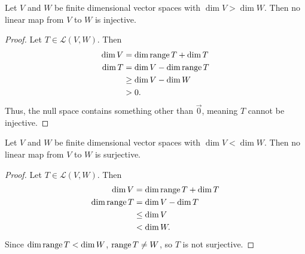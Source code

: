\begin{corollary}
	Let $V$ and $W$ be finite dimensional vector spaces with $\dim{V} > \dim{W}$.
	Then no linear map from $V$ to $W$ is injective.
\end{corollary}
\begin{proof}
	Let $T \in \mathcal{L}(V,W)$.
	Then
	\begin{align*}
		\dim{V} &= \dim{\range{T}} + \dim{\null{T}} \\
		\dim{\null{T}} &= \dim{V} - \dim{\range{T}} \\
			&\geq \dim{V} - \dim{W} \\
			&> 0.
	\end{align*}
	Thus, the null space contains something other than $\vec{0}$, meaning $T$ cannot be injective.
\end{proof}

\begin{corollary}
	Let $V$ and $W$ be finite dimensional vector spaces with $\dim{V} < \dim{W}$.
	Then no linear map from $V$ to $W$ is surjective.
\end{corollary}
\begin{proof}
	Let $T \in \mathcal{L}(V,W)$.
	Then
	\begin{align*}
		\dim{V} &= \dim{\range{T}} + \dim{\null{T}} \\
		\dim{\range{T}} &= \dim{V} - \dim{\null{T}} \\
			&\leq \dim{V}  \\
			&< \dim{W}.
	\end{align*}
	Since $\dim{\operatorname{range}{T}} < \dim{W}$, $\operatorname{range}{T} \neq W$, so $T$ is not surjective.
\end{proof}
